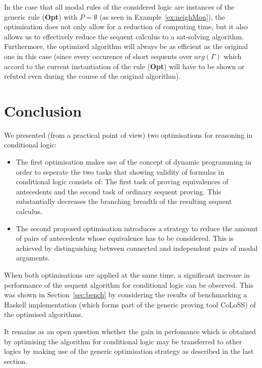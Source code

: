 \documentclass{entcs} \usepackage{entcsmacro}
\newcommand{\COLOSS}{{\textrm CoLoSS}}
\begin{document}
\begin{remark}
In the case that all modal rules of the considered logic are instances of
the generic rule (\textbf{Opt}) with $P=\emptyset$ (as seen in Example~\ref{ex:neighMon}),
the optimisation does not only allow for a reduction of computing time, but
it also allows us to effectively reduce the sequent calculus to a sat-solving
algorithm.
Furthermore, the optimized algorithm will always be as efficient as the
original one in this case (since every occurence of short sequents over $arg(\Gamma)$ 
which accord to the current instantiation of the rule (\textbf{Opt}) will
have to be shown or refuted even during the course of the original algorithm).
\end{remark}

\section{Conclusion}  

We presented (from a practical point of view) two optimisations for reasoning
in conditional logic:
\begin{itemize}
\item The first optimisation makes use of the concept of dynamic programming
in order to seperate the two tasks that showing validity of formulas in conditional
logic consists of: The first task of proving equivalences of antecedents and the second task
of ordinary sequent proving. This substantially decreases the branching breadth
of the resulting sequent calculus.
\item The second proposed optimisation introduces a strategy to reduce the amount
of pairs of antecedents whose equivalence has to be considered. This is achieved
by distinguishing between connected and independent pairs of modal arguments.
\end{itemize}
When both optimisations are applied at the same time, a significant increase in
performance of the sequent algorithm for conditional logic can be observed.
This was shown in 
Section~\ref{sec:bench} by considering the results of benchmarking a Haskell
implementation (which forms part of the generic proving tool \COLOSS) of the
optimised algorithms.

It remains as an open question whether the gain in perfomance which is obtained
by optimising the algorithm for conditional logic may be transferred to other
logics by making use of the generic optimisation strategy as described in the
last section.



\end{document}
